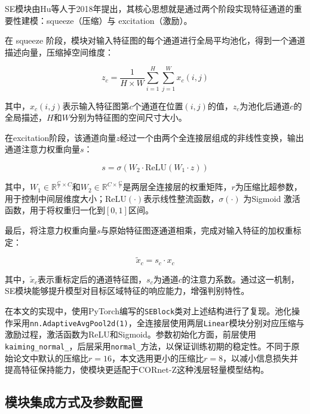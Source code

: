 SE模块由Hu等人于2018年提出\cite{hu2018squeeze}，其核心思想就是通过两个阶段实现特征通道的重要性建模：squeeze（压缩）与 excitation（激励）。

在 squeeze 阶段，模块对输入特征图的每个通道进行全局平均池化，得到一个通道描述向量，压缩掉空间维度：

\begin{equation}
	z_c = 
	\frac{1}{H \times W} 
	\sum_{i=1}^{H} \sum_{j=1}^{W} x_c(i, j)
	\label{eq:se_squeeze}
\end{equation}

其中，$x_c(i,j)$表示输入特征图第$c$个通道在位置$(i,j)$的值，$z_c$为池化后通道$c$的全局描述，$H$和$W$分别为特征图的空间尺寸大小。

在excitation阶段，该通道向量$z$经过一个由两个全连接层组成的非线性变换，输出通道注意力权重向量$s$：

\begin{equation}
	s = \sigma \left( W_2 \cdot \text{ReLU} \left( W_1 \cdot z \right) \right)
	\label{eq:se_excitation}
\end{equation}

其中，$W_1 \in \mathbb{R}^{\frac{C}{r} \times C}$和$W_2 \in \mathbb{R}^{C \times \frac{C}{r}}$是两层全连接层的权重矩阵，$r$为压缩比超参数，用于控制中间层维度大小；$\text{ReLU}(\cdot)$表示线性整流函数，$\sigma(\cdot)$ 为Sigmoid 激活函数，用于将权重归一化到$[0,1]$区间。

最后，将注意力权重向量$s$与原始特征图逐通道相乘，完成对输入特征的加权重标定：

\begin{equation}
	\tilde{x}_c = s_c \cdot x_c
	\label{eq:se_scale}
\end{equation}

其中，$\tilde{x}_c$表示重标定后的通道特征图，$s_c$为通道$c$的注意力系数。通过这一机制，SE模块能够提升模型对目标区域特征的响应能力，增强判别特性。

在本文的实现中，使用PyTorch编写的\texttt{SEBlock}类对上述结构进行了复现。池化操作采用\texttt{nn.AdaptiveAvgPool2d(1)}，全连接层使用两层\texttt{Linear}模块分别对应压缩与激励过程，激活函数为ReLU和Sigmoid。参数初始化方面，前层使用\texttt{kaiming\_normal\_}，后层采用\texttt{normal\_}方法，以保证训练初期的稳定性。不同于原始论文中默认的压缩比$r=16$，本文选用更小的压缩比$r=8$，以减小信息损失并提高特征保持能力，使模块更适配于CORnet-Z这种浅层轻量模型结构。

\subsection{模块集成方式及参数配置}

